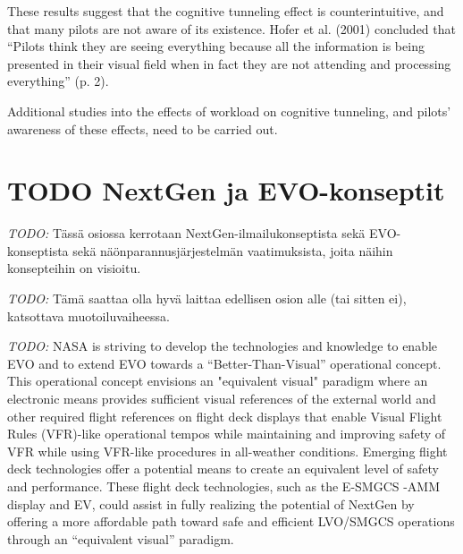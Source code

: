 \documentclass[utf8,bachelor,manualbib]{gradu3}
\begin{document}
These results suggest that the cognitive tunneling effect
is counterintuitive, and that many pilots are not aware of its existence. Hofer
et al. (2001) concluded that “Pilots think they are seeing everything because all
the information is being presented in their visual field when in fact they are not
attending and processing everything” (p. 2).

Additional studies into the effects
of workload on cognitive tunneling, and pilots’ awareness of these effects, need
to be carried out. \citep{crawfordneal2006}


\section{TODO NextGen ja EVO-konseptit}

\emph{TODO:}
Tässä osiossa kerrotaan NextGen-ilmailukonseptista sekä EVO-konseptista sekä näönparannusjärjestelmän vaatimuksista, joita näihin konsepteihin on visioitu.

\emph{TODO:}
Tämä saattaa olla hyvä laittaa edellisen osion alle (tai sitten ei), katsottava muotoiluvaiheessa.

\emph{TODO:}
NASA is striving to develop the technologies and knowledge to enable EVO and to extend EVO towards a “Better-Than-Visual” operational concept. This operational concept envisions an "equivalent visual" paradigm where an electronic means provides sufficient visual references of the external world and other required flight references on flight deck displays that enable Visual Flight Rules (VFR)-like operational tempos while maintaining and improving safety of VFR while using VFR-like procedures in all-weather conditions.\citep{prinzel2013}
Emerging flight deck technologies offer a potential means to create an equivalent level of safety and performance. These flight deck technologies, such as the E-SMGCS -AMM display and EV, could assist in fully realizing the potential of NextGen by offering a more affordable path toward safe and efficient LVO/SMGCS operations through an “equivalent visual” paradigm.\citep{prinzel2013}
\end{document}
